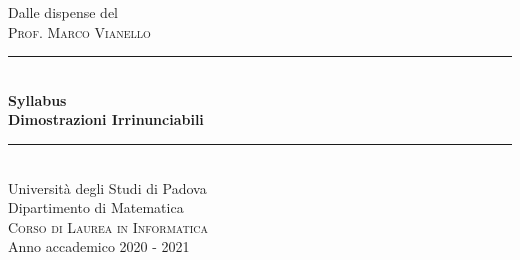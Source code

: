 \documentclass[12pt,a4paper,headings=optiontohead]{article}
\begin{document}

\begin{titlepage}

\newcommand{\HRule}{\rule{\linewidth}{0.5mm}} %

\center %
 


\large Dalle dispense del\\[0.5cm] %
\textsc{\Large Prof. Marco Vianello}\\[1.5cm] %

\HRule \\[0.4cm]
{ \huge \bfseries Syllabus}\\
{ \huge \bfseries Dimostrazioni Irrinunciabili\\[0.15 cm]} %
\HRule \\[1.5cm]
 



\LARGE Università degli Studi di Padova\\[0.4cm] %
{\large Dipartimento di Matematica}\\[0.05cm]
\textsc{\large Corso di Laurea in Informatica}\\[1cm] %

{\Large Anno accademico 2020 - 2021}\\[2cm] %

\vfill %

\end{titlepage}
\end{document}
